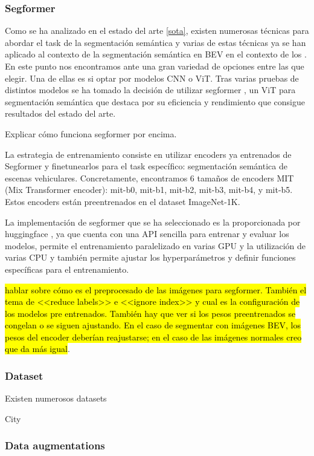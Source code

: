 \subsubsection{Segformer}
Como se ha analizado en el estado del arte \ref{sota}, existen numerosas técnicas para abordar el task de la segmentación semántica y varias de estas técnicas ya se han aplicado al contexto de la segmentación semántica en BEV en el contexto de los . En este punto nos encontramos ante una gran variedad de opciones entre las que elegir. Una de ellas es si optar por modelos CNN o ViT. Tras varias pruebas de distintos modelos \cite{dummy} \cite{dummy} \cite{dummy} se ha tomado la decisión de utilizar segformer \cite{segformer}, un ViT para segmentación semántica que destaca por su eficiencia y rendimiento que consigue resultados del estado del arte.

Explicar cómo funciona segformer por encima.

La estrategia de entrenamiento consiste en utilizar encoders ya entrenados de Segformer y finetunearlos para el task específico: segmentación semántica de escenas vehiculares. Concretamente, encontramos 6 tamaños de encoders MIT (Mix Transformer encoder): mit-b0, mit-b1, mit-b2, mit-b3, mit-b4, y mit-b5. Estos encoders están preentrenados en el dataset ImageNet-1K.

La implementación de segformer que se ha seleccionado es la proporcionada por huggingface \cite{huggingface}, ya que cuenta con una API sencilla para entrenar y evaluar los modelos, permite el entrenamiento paralelizado en varias GPU y la utilización de varias CPU y también permite ajustar los hyperparámetros y definir funciones específicas para el entrenamiento.

\hl{hablar sobre cómo es el preprocesado de las imágenes para segformer. También el tema de <<reduce labels>> e <<ignore index>> y cual es la configuración de los modelos pre entrenados. También hay que ver si los pesos preentrenados se congelan o se siguen ajustando. En el caso de segmentar con imágenes BEV, los pesos del encoder deberían reajustarse; en el caso de las imágenes normales creo que da más igual}.

\subsubsection{Dataset}
Existen numerosos datasets 

City

\subsubsection{Data augmentations}
